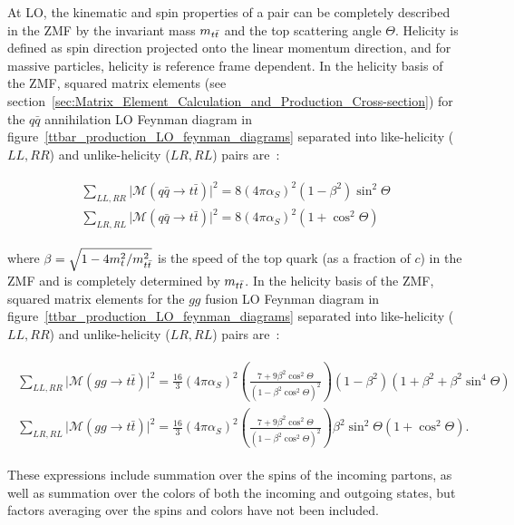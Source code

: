 At LO, the kinematic and spin properties of a \ttbar pair can be completely described in the \ttbar ZMF by the invariant mass $m_{t\bar{t}}$ and the top scattering angle $\Theta$.
Helicity is defined as spin direction projected onto the linear momentum direction, and for massive particles, helicity is reference frame dependent.
In the helicity basis of the \ttbar ZMF, squared matrix elements (see section~\ref{sec:Matrix_Element_Calculation_and_Production_Cross-section}) for the $q\bar{q}$ annihilation LO Feynman diagram in figure~\ref{ttbar_production_LO_feynman_diagrams} separated into like-helicity ($L L, R R$) and unlike-helicity ($L R, R L$) \ttbar pairs are~\cite{PhysRevD.53.4886}:
\begin{linenomath*}
\begin{align}
\begin{array}{c}
\sum_{L L, R R}\vert\mathcal{M}(q \bar{q} \rightarrow t \bar{t})\vert^2=8 (4 \pi \alpha_S)^2 \left(1-\beta^2\right) \sin ^2 \Theta \\
\sum_{L R, R L}\vert\mathcal{M}(q \bar{q} \rightarrow t \bar{t})\vert^2=8 (4 \pi \alpha_S)^2 \left(1+\cos ^2 \Theta\right)
\end{array}
\label{qq_matrix_elements}
\end{align}
\end{linenomath*}
where $\beta=\sqrt{1-4 m_t^2 / m_{t\bar{t}}^2}$ is the speed of the top quark (as a fraction of $c$) in the \ttbar ZMF and is completely determined by $m_{t\bar{t}}$.
In the helicity basis of the \ttbar ZMF, squared matrix elements for the $gg$ fusion LO Feynman diagram in figure~\ref{ttbar_production_LO_feynman_diagrams} separated into like-helicity ($L L, R R$) and unlike-helicity ($L R, R L$) \ttbar pairs are~\cite{PhysRevD.53.4886}:
\begin{linenomath*}
\begin{align}
\begin{array}{c}
\sum_{L L, R R}\vert\mathcal{M}(g g \rightarrow t \bar{t})\vert^2=\frac{16}{3} (4 \pi \alpha_S)^2 (\frac{7+9 \beta^2 \cos ^2 \Theta}{\left(1-\beta^2 \cos ^2 \Theta\right)^2}) \left(1-\beta^2\right)\left(1+\beta^2+\beta^2 \sin ^4 \Theta\right) \\
\sum_{L R, R L}\vert\mathcal{M}(g g \rightarrow t \bar{t})\vert^2=\frac{16}{3} (4 \pi \alpha_S)^2 (\frac{7+9 \beta^2 \cos ^2 \Theta}{\left(1-\beta^2 \cos ^2 \Theta\right)^2}) \beta^2 \sin ^2 \Theta\left(1+\cos ^2 \Theta\right).
\end{array}
\label{gg_matrix_elements}
\end{align}
\end{linenomath*}
These expressions include summation over the spins of the incoming partons, as well as summation over the colors of both the incoming and outgoing states, but factors averaging over the spins and colors have not been included.

